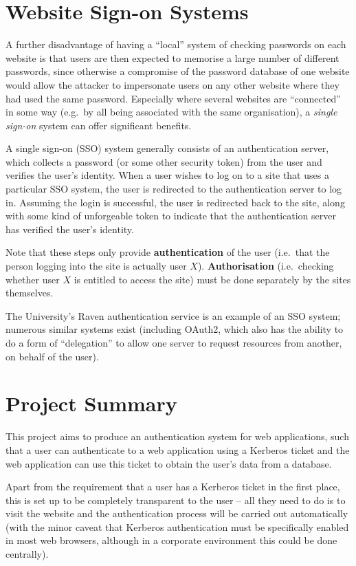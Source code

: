 \documentclass{report}
\begin{document}
\section{Website Sign-on Systems}
A further disadvantage of having a ``local'' system of checking passwords on each website is that users are then expected to memorise a large number of different passwords, since otherwise a compromise of the password database of one website would allow the attacker to impersonate users on any other website where they had used the same password. Especially where several websites are ``connected'' in some way (e.g.\ by all being associated with the same organisation), a \textit{single sign-on} system can offer significant benefits.

A single sign-on (SSO) system generally consists of an authentication server, which collects a password (or some other security token) from the user and verifies the user's identity. When a user wishes to log on to a site that uses a particular SSO system, the user is redirected to the authentication server to log in. Assuming the login is successful, the user is redirected back to the site, along with some kind of unforgeable token to indicate that the authentication server has verified the user's identity.

Note that these steps only provide \textbf{authentication} of the user (i.e.\ that the person logging into the site is actually user $X$). \textbf{Authorisation} (i.e.\ checking whether user $X$ is entitled to access the site) must be done separately by the sites themselves.

The University's Raven authentication service is an example of an SSO system; numerous similar systems exist (including OAuth2, which also has the ability to do a form of ``delegation'' to allow one server to request resources from another, on behalf of the user\cite{Oracle-OAuth2}).

\section{Project Summary}
This project aims to produce an authentication system for web applications, such that a user can authenticate to a web application using a Kerberos ticket and the web application can use this ticket to obtain the user's data from a database.

Apart from the requirement that a user has a Kerberos ticket in the first place, this is set up to be completely transparent to the user -- all they need to do is to visit the website and the authentication process will be carried out automatically (with the minor caveat that Kerberos authentication must be specifically enabled in most web browsers, although in a corporate environment this could be done centrally).
\end{document}
